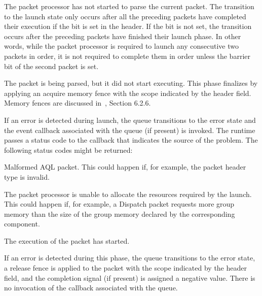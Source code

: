 \documentclass[final,oneside]{book}
\begin{document}
\begin{description}[itemsep=2pt,leftmargin=0cm, labelindent=0cm]
\item[In queue] The packet processor has not started to parse the current
  packet.  The transition to the launch state only occurs after all the
  preceding packets have completed their execution if the
   bit is set in the header. If the bit is
  not set, the transition occurs after the preceding packets have finished their
  launch phase. In other words, while the packet processor is required to launch
  any consecutive two packets in order, it is not required to complete them in
  order unless the barrier bit of the second packet is set.

\item[Launch] The packet is being parsed, but it did not start executing. This
  phase finalizes by applying an acquire memory fence with the scope indicated
  by the  header field.  Memory
  fences are discussed in~\cite{prm}, Section 6.2.6.

  If an error is detected during launch, the queue transitions to the error
  state and the event callback associated with the queue (if present) is
  invoked. The runtime passes a status code to the callback that indicates the
  source of the problem.  The following status codes might be returned:
  \begin{description}[itemsep=1.5pt,labelindent=.5cm]
  \item[\hsaref{HSA_STATUS_ERROR_INVALID_PACKET_FORMAT}] Malformed AQL
    packet. This could happen if, for example, the packet header type is invalid.
  \item[\hsaref{HSA_STATUS_ERROR_OUT_OF_RESOURCES}] The packet processor is
    unable to allocate the resources required by the launch. This could happen
    if, for example, a Dispatch packet requests more group memory than the size
    of the group memory declared by the corresponding component.
  \end{description}
\item[Active] The execution of the packet has started.

  If an error is detected during this phase, the queue transitions to the error
  state, a release fence is applied to the packet with the scope indicated by
  the  header field, and the
  completion signal (if present) is assigned a negative value. There is no
  invocation of the callback associated with the queue.


\end{description}
\end{document}
